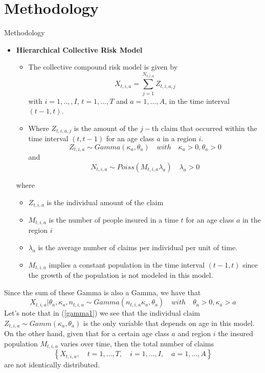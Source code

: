 \documentclass[10pt]{beamer} %
\begin{document}
\section{Methodology}
\begin{frame}{Methodology}
\begin{itemize}
\item \textbf{Hierarchical Collective Risk Model}\\
\begin{itemize}
    \item The collective compound risk model is given by $$X_{t,i,a}=\sum_{j=1}^{N_{t,i,a}}Z_{t,i,a,j}$$ with $i=1,..,,I$, $t=1,...,T$ and $a=1,...,A$, in the time interval $(t-1,t)$.
    \item Where $Z_{t,i,a,j}$ is the amount of the $j-$th claim that occurred within the time interval $(t,t-1)$ for an age class $a$ in a region $i$.\\
        \begin{equation}\label{gamma1}
        Z_{t,i,a}\sim Gamma(\kappa_a,\theta_a)\quad with\quad \kappa_a>0,\theta_a>0
    \end{equation}
    and 
    \begin{equation}
    \label{poisson1}
    N_{t,i,a}\sim Poiss(M_{t,i,a}\lambda_a)\quad \lambda_a>0
    \end{equation} 
\end{itemize}
       
where 
\begin{itemize}
    \item $Z_{t,i,a}$ is the individual amount of the claim
    \item $M_{t,i,a}$ is the number of people insured in a time $t$ for an age class $a$ in the region $i$
    \item $\lambda_a$ is the average number of claims per individual per unit of time.
    \item $M_{t,i,a}$ implies a constant population in the time interval $(t-1,t)$ since the growth of the population is not modeled in this model.
\end{itemize}
    \end{itemize}
\end{frame}
\begin{frame}
    Since the sum of these Gamma is also a Gamma, we have that 
    $$X_{t,i,a}|\theta_a,\kappa_a,n_{t,i,a}\sim Gamma(n_{t,i,a}\kappa_a,\theta_a)\quad with\quad \theta_a>0,\kappa_a>a$$
    Let's note that in (\ref{gamma1}) we see that the individual claim $Z_{t,i,a}\sim Gamm(\kappa_a,\theta_a)$ is the only variable that depends on age in this model.\\
    On the other hand, given that for a certain age class $a$ and region $i$ the insured population $M_ {t, i, a}$ varies over time, then the total number of claims $$\left\{X_{t, i, a},\quad t = 1, ..., T,\quad i = 1, ..., I,\quad a = 1, ..., A\right\}$$ are not identically distributed.
\end{frame}
\end{document}
